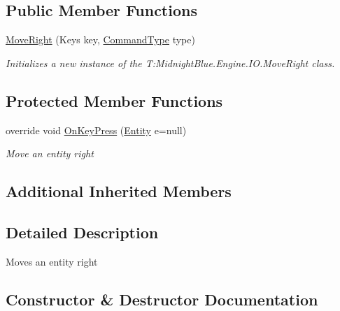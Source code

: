 \subsection*{Public Member Functions}
\begin{DoxyCompactItemize}
\item 
\hyperlink{class_midnight_blue_1_1_engine_1_1_i_o_1_1_move_right_aa19d6338eb31dfc64a832e0c397b7f8b}{Move\+Right} (Keys key, \hyperlink{namespace_midnight_blue_1_1_engine_1_1_i_o_a8bc3f159399ecadd590f7df1b54354b0}{Command\+Type} type)
\begin{DoxyCompactList}\small\item\em Initializes a new instance of the T\+:\+Midnight\+Blue.\+Engine.\+I\+O.\+Move\+Right class. \end{DoxyCompactList}\end{DoxyCompactItemize}
\subsection*{Protected Member Functions}
\begin{DoxyCompactItemize}
\item 
override void \hyperlink{class_midnight_blue_1_1_engine_1_1_i_o_1_1_move_right_ac5599c043c22620c4dc35c89fcc85728}{On\+Key\+Press} (\hyperlink{class_midnight_blue_1_1_engine_1_1_entity_component_1_1_entity}{Entity} e=null)
\begin{DoxyCompactList}\small\item\em Move an entity right \end{DoxyCompactList}\end{DoxyCompactItemize}
\subsection*{Additional Inherited Members}


\subsection{Detailed Description}
Moves an entity right 



\subsection{Constructor \& Destructor Documentation}
\hypertarget{class_midnight_blue_1_1_engine_1_1_i_o_1_1_move_right_aa19d6338eb31dfc64a832e0c397b7f8b}{}\label{class_midnight_blue_1_1_engine_1_1_i_o_1_1_move_right_aa19d6338eb31dfc64a832e0c397b7f8b} 
